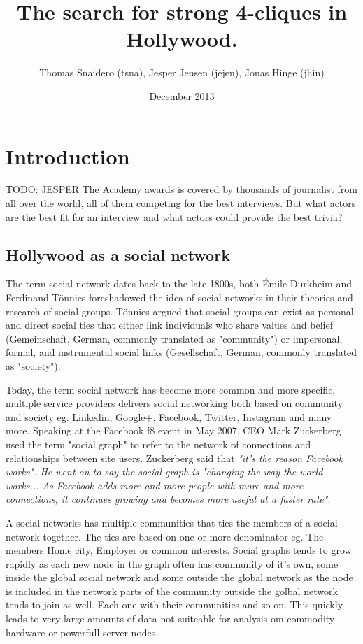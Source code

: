 \documentclass{article}
\title{The search for strong 4-cliques in Hollywood.}
\author{Thomas Snaidero (tsna), Jesper Jensen (jejen), Jonas Hinge (jhin)}
\date{December 2013}
\begin{document}
\maketitle

\section{Introduction}
TODO: JESPER
The Academy awards is covered by thousands of journalist from all over the world, all of them competing for the best interviews. But what actors are the best fit for an interview and what actors could provide the best trivia?

\subsection{Hollywood as a social network}
The term social network dates back to the late 1800s, both Émile Durkheim and Ferdinand Tönnies foreshadowed the idea of social networks in their theories and research of social groups. Tönnies argued that social groups can exist as personal and direct social ties that either link individuals who share values and belief (Gemeinschaft, German, commonly translated as "community") or impersonal, formal, and instrumental social links (Gesellschaft, German, commonly translated as "society").

\noindent Today, the term social network has become more common and more specific, multiple service providers delivers social networking both based on community and society eg. Linkedin, Google+, Facebook, Twitter, Instagram and many more. Speaking at the Facebook f8 event in May 2007, CEO Mark Zuckerberg used the term "social graph" to refer to the network of connections and relationships between site users. Zuckerberg said that \textit{ "it's the reason Facebook works". He went on to say the social graph is "changing the way the world works... As Facebook adds more and more people with more and more connections, it continues growing and becomes more useful at a faster rate"}. \cite{socialgraphwiki}

\noindent A social networks has multiple communities that ties the members of a social network together. The ties are based on one or more denominator eg. The members Home city, Employer or common interests. Social graphs tends to grow rapidly as each new node in the graph often has community of it's own, some inside the global social network and some outside the global network as the node is included in the network parts of the community outside the golbal network tends to join as well. Each one with their communities and so on. This quickly leads to very large amounts of data not suiteable for analysis om commodity hardware or powerfull server nodes.
\end{document}
